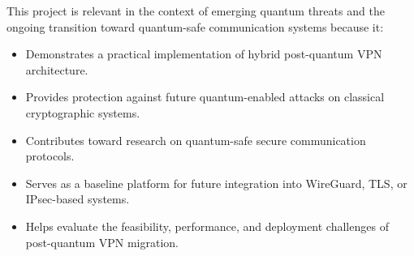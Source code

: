 This project is relevant in the context of emerging quantum threats and the ongoing transition toward quantum-safe communication systems because it:

\begin{itemize}

    \item Demonstrates a practical implementation of hybrid post-quantum VPN architecture.

    \item Provides protection against future quantum-enabled attacks on classical cryptographic systems.

    \item Contributes toward research on quantum-safe secure communication protocols.

    \item Serves as a baseline platform for future integration into WireGuard, TLS, or IPsec-based systems.

    \item Helps evaluate the feasibility, performance, and deployment challenges of post-quantum VPN migration.

\end{itemize}
